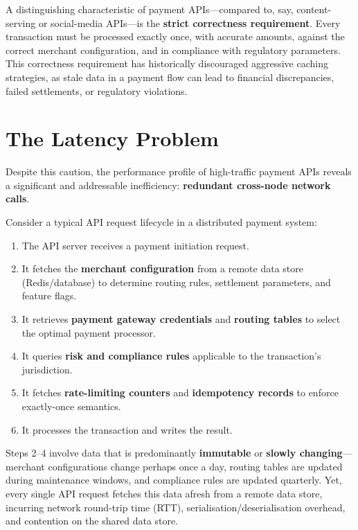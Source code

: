 \documentclass[12pt,a4paper]{report}
\begin{document}
A distinguishing characteristic of payment APIs—compared to, say, content-serving or social-media APIs—is the \textbf{strict correctness requirement}. Every transaction must be processed exactly once, with accurate amounts, against the correct merchant configuration, and in compliance with regulatory parameters. This correctness requirement has historically discouraged aggressive caching strategies, as stale data in a payment flow can lead to financial discrepancies, failed settlements, or regulatory violations.

\section{The Latency Problem}

Despite this caution, the performance profile of high-traffic payment APIs reveals a significant and addressable inefficiency: \textbf{redundant cross-node network calls}.

Consider a typical API request lifecycle in a distributed payment system:

\begin{enumerate}
    \item The API server receives a payment initiation request.
    \item It fetches the \textbf{merchant configuration} from a remote data store (Redis/database) to determine routing rules, settlement parameters, and feature flags.
    \item It retrieves \textbf{payment gateway credentials} and \textbf{routing tables} to select the optimal payment processor.
    \item It queries \textbf{risk and compliance rules} applicable to the transaction's jurisdiction.
    \item It fetches \textbf{rate-limiting counters} and \textbf{idempotency records} to enforce exactly-once semantics.
    \item It processes the transaction and writes the result.
\end{enumerate}

Steps 2–4 involve data that is predominantly \textbf{immutable} or \textbf{slowly changing}—merchant configurations change perhaps once a day, routing tables are updated during maintenance windows, and compliance rules are updated quarterly. Yet, every single API request fetches this data afresh from a remote data store, incurring network round-trip time (RTT), serialisation/deserialisation overhead, and contention on the shared data store.
\end{document}
